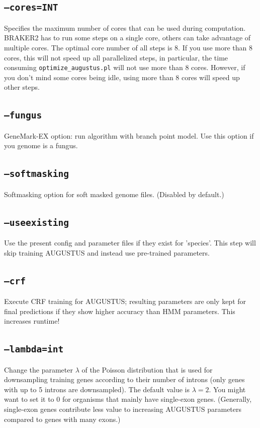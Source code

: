 \documentclass[a4paper,10pt]{report}
\begin{document}
\subsection{\texttt{--cores=INT}}                              Specifies the maximum number of cores that can be used during computation. BRAKER2 has to run some steps on a single core, others can take advantage of multiple cores. The optimal core number of all steps is 8. If you use more than 8 cores, this will not speed up all parallelized steps, in particular, the time consuming \texttt{optimize\_augustus.pl} will not use more than 8 cores. However, if you don't mind some cores being idle, using more than 8 cores will speed up other steps.
\subsection{\texttt{--fungus}}                             GeneMark-EX option: run algorithm with branch point model. Use this option if you genome is a fungus.
    \subsection{\texttt{--softmasking}}                        Softmasking option for soft masked genome files. (Disabled by default.)
   
    \subsection{\texttt{--useexisting}}                        Use the present config and parameter files if they exist for 
                                         'species'. This step will skip training AUGUSTUS and instead use pre-trained parameters.
  
    \subsection{\texttt{--crf}}                                Execute CRF training for AUGUSTUS; resulting parameters are only kept for
                                         final predictions if they show higher accuracy than HMM parameters. This increases runtime!
    \subsection{\texttt{--lambda=int}}
    Change the parameter $\lambda$ of the Poisson distribution that is used for downsampling training genes according to their number of introns (only genes with up to 5 introns are downsampled). The default value is $\lambda=2$. You might want to set it to 0 for organisms that mainly have single-exon genes. (Generally, single-exon genes contribute less value to increasing AUGUSTUS parameters compared to genes with many exons.)
              
\end{document}
